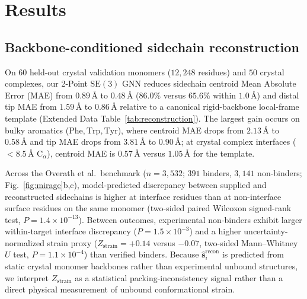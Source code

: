 \documentclass[10pt,twocolumn]{article}
\begin{document}
\section{Results}

\subsection{Backbone-conditioned sidechain reconstruction}
On $60$ held-out crystal validation monomers ($12,248$ residues) and $50$ crystal complexes, our 2-Point $\text{SE}(3)$ GNN reduces sidechain centroid Mean Absolute Error (MAE) from $0.89\,\text{\AA}$ to $0.48\,\text{\AA}$ ($86.0\%$ versus $65.6\%$ within $1.0\,\text{\AA}$) and distal tip MAE from $1.59\,\text{\AA}$ to $0.86\,\text{\AA}$ relative to a canonical rigid-backbone local-frame template (Extended Data Table~\ref{tab:reconstruction}). The largest gain occurs on bulky aromatics ($\text{Phe}, \text{Trp}, \text{Tyr}$), where centroid MAE drops from $2.13\,\text{\AA}$ to $0.58\,\text{\AA}$ and tip MAE drops from $3.81\,\text{\AA}$ to $0.90\,\text{\AA}$; at crystal complex interfaces ($<8.5\,\text{\AA}$ $\text{C}_\alpha$), centroid MAE is $0.57\,\text{\AA}$ versus $1.05\,\text{\AA}$ for the template.

Across the Overath et al.\ benchmark ($n=3,532$; $391$ binders, $3,141$ non-binders; Fig.~\ref{fig:mirage}b,c), model-predicted discrepancy between supplied and reconstructed sidechains is higher at interface residues than at non-interface surface residues on the same monomer (two-sided paired Wilcoxon signed-rank test, $P = 1.4\times 10^{-13}$). Between outcomes, experimental non-binders exhibit larger within-target interface discrepancy ($P = 1.5\times 10^{-3}$) and a higher uncertainty-normalized strain proxy ($Z_{\text{strain}} = +0.14$ versus $-0.07$, two-sided Mann--Whitney $U$ test, $P = 1.1\times 10^{-4}$) than verified binders. Because $\hat{\mathbf{s}}_i^{\text{recon}}$ is predicted from static crystal monomer backbones rather than experimental unbound structures, we interpret $Z_{\text{strain}}$ as a statistical packing-inconsistency signal rather than a direct physical measurement of unbound conformational strain.
\end{document}
